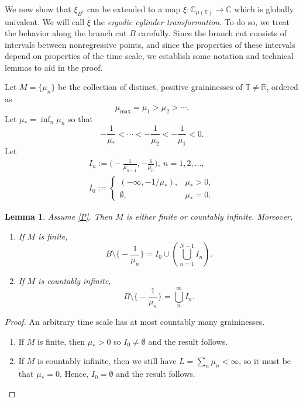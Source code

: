 \documentclass[10pt,a4paper]{amsart}
\numberwithin{equation}{section}
\newtheorem{lemma}[theorem]{Lemma}
\begin{document}
We now show that $\overline{\xi}_{B^c}$ can be extended to a map $\overline{\xi}:\mathbb{C}_{\mu(\mathbb{T})} \to \mathbb{C}$
which is globally univalent. We will call $\overline{\xi}$ the \emph{ergodic cylinder
transformation}. To do so, we treat the behavior along the branch cut $B$ carefully.
Since the branch cut consists of intervals between nonregressive points, and since
the properties of these intervals depend on properties of the time scale, we establish
some notation and technical lemmas to aid in the proof.

Let $M=\{\mu_n\}$ be the collection of distinct, positive graininesses of $\mathbb{T}\not=\mathbb{R}$,
ordered as
$$
\mu_{\max}=\mu_1>\mu_2>\cdots.
$$
Let $\mu_*=\inf_{n} \mu_n$ so that
$$
 -\frac{1}{\mu_*}<\cdots < -\frac{1}{\mu_2} < -\frac{1}{\mu_1}<0.
$$
Let
 \begin{gather*}
 I_n:=\Big(-\frac{1}{\mu_{n+1}},-\frac{1}{\mu_n}\Big),\ n=1,2,\dots,\\
 I_0:=
 \begin{cases}
 (-\infty,-1/\mu_*), & \mu_*>0,\\
 \emptyset, & \mu_*=0.
 \end{cases}
 \end{gather*}

\begin{lemma}
\label{lem:B_structure}
Assume \eqref{P}. Then $M$ is either finite or countably infinite. Moreover,
\begin{enumerate}
 \item If $M$ is finite,
 $$
 B\setminus \Big\{-\frac{1}{\mu_n}\Big\} = I_0 \cup \left(\bigcup_{n=1}^{N-1} I_n\right).
 $$

 \item If $M$ is countably infinite,
 $$
 B\setminus \Big\{-\frac{1}{\mu_n}\Big\} = \bigcup_n^\infty I_n.
 $$
\end{enumerate}
\end{lemma}

\begin{proof}
An arbitrary time scale has at most countably many graininesses.
 \begin{enumerate}
 \item If $M$ is finite, then $\mu_*>0$ so $I_0\not=\emptyset$ and the result follows.
 \item If $M$ is countably infinite, then we still have $ L=\sum_n \mu_n<\infty$,
 so it must be that $\mu_*=0$. Hence, $I_0=\emptyset$ and the result follows.
 \end{enumerate}
\end{proof}
\end{document}
